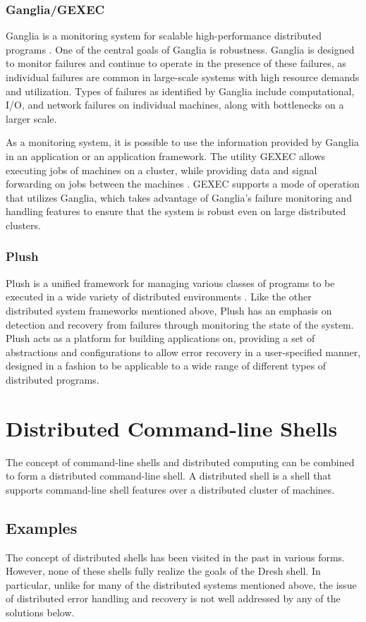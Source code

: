 \documentclass[twoside]{report}
\begin{document}
\subsubsection{Ganglia/GEXEC}
Ganglia is a monitoring system for scalable high-performance distributed programs \cite{MASSIE2004817}.
One of the central goals of Ganglia is robustness.
Ganglia is designed to monitor failures and continue to operate in the presence of these failures, as individual failures are common in large-scale systems with high resource demands and utilization.
Types of failures as identified by Ganglia include computational, I/O, and network failures on individual machines, along with bottlenecks on a larger scale.

As a monitoring system, it is possible to use the information provided by Ganglia in an application or an application framework.
The utility GEXEC allows executing jobs of machines on a cluster, while providing data and signal forwarding on jobs between the machines \cite{gexec}.
GEXEC supports a mode of operation that utilizes Ganglia, which takes advantage of Ganglia's failure monitoring and handling features to ensure that the system is robust even on large distributed clusters.

\subsubsection{Plush}
Plush is a unified framework for managing various classes of programs to be executed in a wide variety of distributed environments \cite{10.5555/1349426.1349441}.
Like the other distributed system frameworks mentioned above, Plush has an emphasis on detection and recovery from failures through monitoring the state of the system.
Plush acts as a platform for building applications on, providing a set of abstractions and configurations to allow error recovery in a user-specified manner, designed in a fashion to be applicable to a wide range of different types of distributed programs.

\section{Distributed Command-line Shells}
The concept of command-line shells and distributed computing can be combined to form a distributed command-line shell.
A distributed shell is a shell that supports command-line shell features over a distributed cluster of machines.

\subsection{Examples}
The concept of distributed shells has been visited in the past in various forms.
However, none of these shells fully realize the goals of the Dresh shell.
In particular, unlike for many of the distributed systems mentioned above, the issue of distributed error handling and recovery is not well addressed by any of the solutions below.
\end{document}
